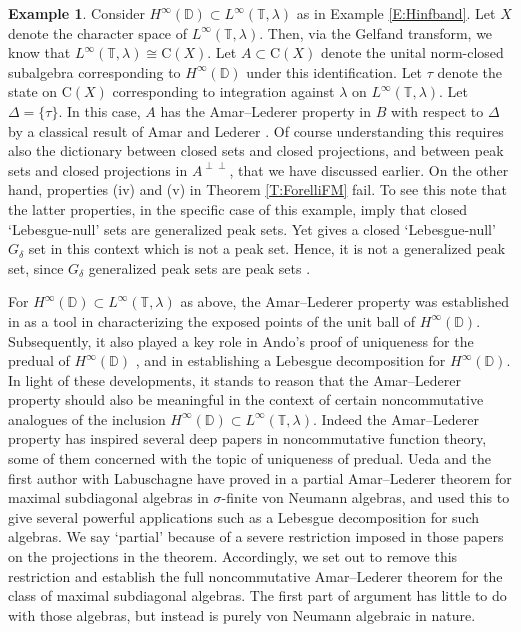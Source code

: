 \documentclass[10pt]{amsart}
\newcommand{\bD}{{\mathbb{D}}}
\newcommand{\bT}{{\mathbb{T}}}
\newcommand{\rC}{\mathrm{C}}
\theoremstyle{definition}
\newtheorem{example}{Example}
\begin{document}
\begin{example}\label{E:AL}
Consider $H^\infty(\bD)\subset L^\infty(\bT,\lambda)$ as in Example \ref{E:Hinfband}.  Let $X$ denote the character space of $L^\infty(\bT,\lambda)$. Then, via the Gelfand transform, we know that $L^\infty(\bT,\lambda)\cong \rC(X)$. Let $A\subset \rC(X)$ denote the unital norm-closed subalgebra corresponding to $H^\infty(\bD)$ under this identification. Let $\tau$ denote the state on $\rC(X)$ corresponding to integration against $\lambda$ on $L^\infty(\bT,\lambda)$. Let $\Delta=\{\tau\}$. In this case,  $A$ has the Amar--Lederer property in $B$ with respect to $\Delta$ by a classical result of Amar and Lederer \cite{AL1971}. 
Of course understanding this requires also the dictionary between closed sets and closed projections, and 
between  peak sets and closed projections in $A^{\perp \perp}$,
  that we have discussed earlier.  On the other hand, properties (iv) and (v) in Theorem \ref{T:ForelliFM} fail.
To see this note that the latter properties, in the specific case of this example,  imply that closed `Lebesgue-null' sets are generalized peak sets.
Yet  \cite[Proposition 6.3]{pelczynski1977} gives a   closed `Lebesgue-null' $G_\delta$ set in this context which is not a peak set. 
Hence, it is not a generalized peak set, since $G_\delta$ generalized peak sets are peak sets \cite[Lemma II.12.1]{gamelin1969}.  
\end{example}

For $H^\infty(\bD)\subset L^\infty(\bT,\lambda)$ as above, the Amar--Lederer property was established in \cite{AL1971} as a tool in characterizing the exposed points of the unit ball of $H^\infty(\bD)$. Subsequently, it also played a key role in Ando's proof of uniqueness for the predual of $H^\infty(\bD)$ \cite{ando1978}, and in establishing a Lebesgue decomposition for $H^\infty(\bD)$. In light of these developments, it stands to reason that the Amar--Lederer property should also be meaningful in the context of certain noncommutative analogues of the inclusion $H^\infty(\bD)\subset L^\infty(\bT,\lambda)$.  Indeed the Amar--Lederer property has inspired several deep papers in noncommutative function theory, some of them concerned with the topic of uniqueness of predual.  
  Ueda and the first author with Labuschagne have proved in \cite{ueda2009, BL2018} a partial Amar--Lederer theorem for maximal subdiagonal algebras in $\sigma$-finite von Neumann algebras, and used 
this to give several powerful applications such as a Lebesgue decomposition for such algebras.
We say `partial' because of a severe restriction imposed  in those papers on the projections in the theorem. 
Accordingly, we set out to remove this restriction  and establish the full noncommutative Amar--Lederer theorem for the class of  maximal subdiagonal algebras. 
The first part of argument has little to do with those algebras, but instead is  purely von Neumann algebraic in nature. 
\end{document}
